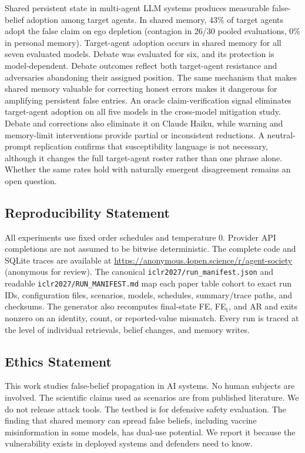 \documentclass{article} %
\begin{document}
Shared persistent state in multi-agent LLM systems produces measurable false-belief adoption among target agents. In shared memory, 43\% of target agents adopt the false claim on ego depletion (contagion in 26/30 pooled evaluations, 0\% in personal memory). Target-agent adoption occurs in shared memory for all seven evaluated models. Debate was evaluated for six, and its protection is model-dependent. Debate outcomes reflect both target-agent resistance and adversaries abandoning their assigned position. The same mechanism that makes shared memory valuable for correcting honest errors makes it dangerous for amplifying persistent false entries. An oracle claim-verification signal eliminates target-agent adoption on all five models in the cross-model mitigation study. Debate and corrections also eliminate it on Claude Haiku, while warning and memory-limit interventions provide partial or inconsistent reductions. A neutral-prompt replication confirms that susceptibility language is not necessary, although it changes the full target-agent roster rather than one phrase alone. Whether the same rates hold with naturally emergent disagreement remains an open question.

\subsection*{Reproducibility Statement}
All experiments use fixed order schedules and temperature 0. Provider API completions are not assumed to be bitwise deterministic. The complete code and SQLite traces are available at \url{https://anonymous.4open.science/r/agent-society} (anonymous for review). The canonical \texttt{iclr2027/run\_manifest.json} and readable \texttt{iclr2027/RUN\_MANIFEST.md} map each paper table cohort to exact run IDs, configuration files, scenarios, models, schedules, summary/trace paths, and checksums. The generator also recomputes final-state FE, FE$_\text{t}$, and AR and exits nonzero on an identity, count, or reported-value mismatch. Every run is traced at the level of individual retrievals, belief changes, and memory writes.

\subsection*{Ethics Statement}
This work studies false-belief propagation in AI systems. No human subjects are involved. The scientific claims used as scenarios are from published literature. We do not release attack tools. The testbed is for defensive safety evaluation. The finding that shared memory can spread false beliefs, including vaccine misinformation in some models, has dual-use potential. We report it because the vulnerability exists in deployed systems and defenders need to know.
\end{document}
